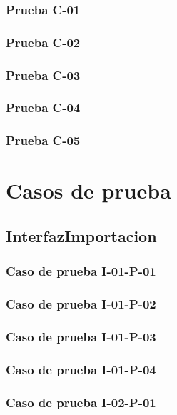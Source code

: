 \documentclass[10pt,a4paper]{article}
\begin{document}
			\subsubsection{Prueba C-01}

			\subsubsection{Prueba C-02}

			\subsubsection{Prueba C-03}

			\subsubsection{Prueba C-04}

			\subsubsection{Prueba C-05}

\section{Casos de prueba}
	\subsection{InterfazImportacion}
			\subsubsection{Caso de prueba I-01-P-01}

			\subsubsection{Caso de prueba I-01-P-02}

			\subsubsection{Caso de prueba I-01-P-03}

			\subsubsection{Caso de prueba I-01-P-04}

			\subsubsection{Caso de prueba I-02-P-01}
\end{document}
